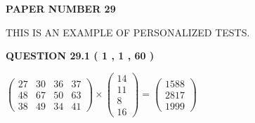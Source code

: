\documentclass[12pt]{article}
\begin{document}
   
   
   
\newpage 
\setcounter{page}{ 
    29001 } 
   
   
   
   
 {\textbf{ \Large{ PAPER NUMBER  29  }}}
   
   
\vspace{0.2in}
   
   
   
   
   
   
 \vspace{0.2in}
{\Huge  THIS IS AN EXAMPLE OF}
{\Huge  PERSONALIZED TESTS. }
   
   
  
\vspace{0.2in}
  
{\textbf{\Large{QUESTION
29.1 
 ( 1 , 1 , 60 )
}}}
  
  
 
 
\noindent{}

 
$\left( \begin{array}{ccccccccccccccc}
 27  & 
 30  & 
 36  & 
 37  \\ 
 48  & 
 67  & 
 50  & 
 63  \\ 
 38  & 
 49  & 
 34  & 
 41
\end{array}\right) \times
\left( \begin{array}{c}
 14  \\ 
 11  \\ 
 8  \\ 
 16
\end{array}\right)  =
\left( \begin{array}{c}
 1588  \\ 
 2817  \\ 
 1999
\end{array}\right)  $
 
\end{document}
